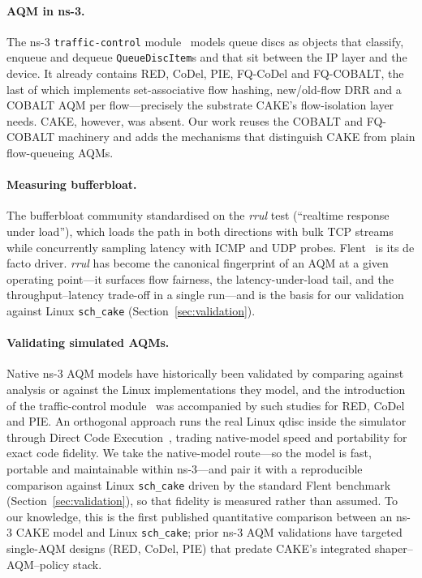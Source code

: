 \documentclass[sigconf,nonacm]{acmart}
\begin{document}
\paragraph{AQM in ns-3.} The ns-3 \texttt{traffic-control}
module~\cite{tcmodule} models queue discs as objects that classify, enqueue and
dequeue \texttt{QueueDiscItem}s and that sit between the IP layer and the
device. It already contains RED, CoDel, PIE, FQ-CoDel and FQ-COBALT, the last
of which implements set-associative flow hashing, new/old-flow DRR and a COBALT
AQM per flow---precisely the substrate CAKE's flow-isolation layer needs.
CAKE, however, was absent. Our work reuses the COBALT and FQ-COBALT machinery
and adds the mechanisms that distinguish CAKE from plain flow-queueing AQMs.

\paragraph{Measuring bufferbloat.} The bufferbloat community standardised on the
\emph{rrul} test (``realtime response under load''), which loads the path in
both directions with bulk TCP streams while concurrently sampling latency with
ICMP and UDP probes. Flent~\cite{flent} is its de facto driver. \emph{rrul} has
become the canonical fingerprint of an AQM at a given operating point---it
surfaces flow fairness, the latency-under-load tail, and the
throughput--latency trade-off in a single run---and is the basis for our
validation against Linux \texttt{sch\_cake} (Section~\ref{sec:validation}).

\paragraph{Validating simulated AQMs.} Native ns-3 AQM models have historically
been validated by comparing against analysis or against the Linux
implementations they model, and the introduction of the traffic-control
module~\cite{tcmodule} was accompanied by such studies for RED, CoDel and PIE.
An orthogonal approach runs the real Linux qdisc inside the simulator through
Direct Code Execution~\cite{dce}, trading native-model speed and portability for
exact code fidelity. We take the native-model route---so the model is fast,
portable and maintainable within ns-3---and pair it with a reproducible
comparison against Linux \texttt{sch\_cake} driven by the standard Flent
benchmark~\cite{flent} (Section~\ref{sec:validation}), so that fidelity is
measured rather than assumed. To our knowledge, this is the first published
quantitative comparison between an ns-3 CAKE model and Linux \texttt{sch\_cake};
prior ns-3 AQM validations have targeted single-AQM designs (RED, CoDel, PIE)
that predate CAKE's integrated shaper--AQM--policy stack.
\end{document}
